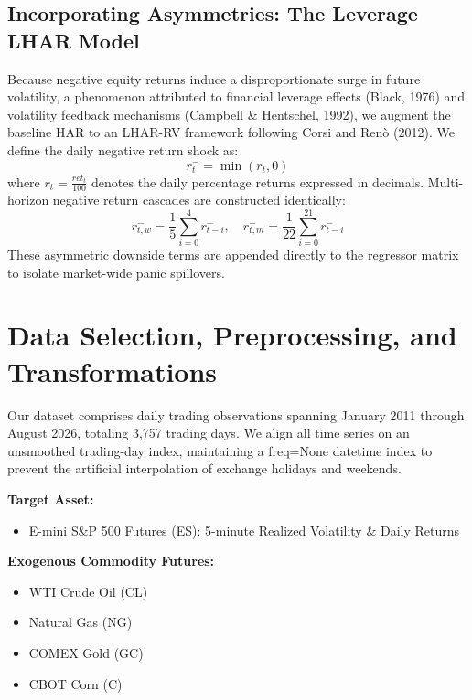 \documentclass{report}
\begin{document}
\section{Incorporating Asymmetries: The Leverage LHAR Model}
Because negative equity returns induce a disproportionate surge in future volatility, a phenomenon attributed to financial leverage effects (Black, 1976) and volatility feedback mechanisms (Campbell \& Hentschel, 1992), we augment the baseline HAR to an LHAR-RV framework following Corsi and Renò (2012). We define the daily negative return shock as: 
\begin{equation}
r_{t}^{-} = \min(r_t, 0)
\end{equation}
where $r_t = \frac{ret_t}{100}$ denotes the daily percentage returns expressed in decimals. Multi-horizon negative return cascades are constructed identically: 
\begin{equation}
r_{t,w}^{-} = \frac{1}{5}\sum_{i=0}^{4}r_{t-i}^{-}, \quad r_{t,m}^{-} = \frac{1}{22}\sum_{i=0}^{21}r_{t-i}^{-}
\end{equation}
These asymmetric downside terms are appended directly to the regressor matrix to isolate market-wide panic spillovers. 

\chapter{Data Selection, Preprocessing, and Transformations}

Our dataset comprises daily trading observations spanning January 2011 through August 2026, totaling 3,757 trading days. We align all time series on an unsmoothed trading-day index, maintaining a freq=None datetime index to prevent the artificial interpolation of exchange holidays and weekends. 

\noindent \textbf{Target Asset:}
\begin{itemize}
    \item E-mini S\&P 500 Futures (ES): 5-minute Realized Volatility \& Daily Returns
\end{itemize}

\noindent \textbf{Exogenous Commodity Futures:}
\begin{itemize}
    \item WTI Crude Oil (CL)
    \item Natural Gas (NG)
    \item COMEX Gold (GC)
    \item CBOT Corn (C)
\end{itemize}
\end{document}
